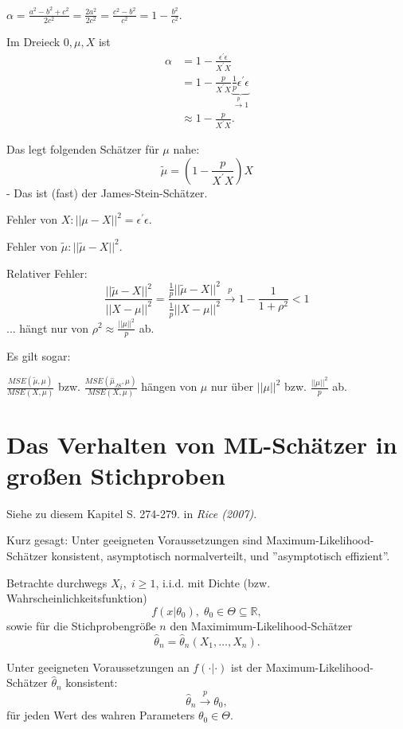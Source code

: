 \documentclass{tstextbook}
\newcommand{\R}{\mathbb R}
\begin{document}
	$ \alpha = \frac{a^2-b^2+c^2}{2c^2} = \frac{2a^2}{2c^2} = \frac{c^2-b^2}{c^2} = 1 - \frac{b^2}{c^2} $. 
	
	Im Dreieck $ 0,\mu,X $ ist 
	\[
	\begin{aligned}
		\alpha & = 1- \frac{\epsilon^\prime\epsilon}{X^\prime X} \\
		& = 1 - \frac{p}{X^\prime X}\underbrace{\frac{1}{p}\epsilon^\prime\epsilon}_{\xrightarrow{p} 1} \\
		& \approx 1- \frac{p}{X^\prime X}.
	\end{aligned}
	\]
	
	Das legt folgenden Schätzer für $ \mu $ nahe:
	\[
	\tilde{\mu} = \left(1-\frac{p}{X^\prime X}\right)X
	\]
	- Das ist (fast) der James-Stein-Schätzer. 
	
	Fehler von $ X\colon ||\mu-X||^2 = \epsilon^\prime \epsilon $. 
	
	Fehler von $ \tilde{\mu}  \colon ||\tilde{\mu} -X||^2 $. 
	
	Relativer Fehler: 
	\[
	\frac{||\tilde{\mu}-X||^2}{||X-\mu||^2} = \frac{\frac{1}{p}||\tilde{\mu}-X||^2}{\frac{1}{p}||X-\mu||^2} \xrightarrow{p} 1-\frac{1}{1+\rho^2} < 1
	\]
	... hängt nur von $ \rho^2  \approx \frac{||\mu||^2}{p} $ ab.
	
	Es gilt sogar:
	
	$ \frac{MSE(\tilde{\mu},\mu)}{MSE(X,\mu)} $ bzw. 	$ \frac{MSE(\hat{\mu}_{JS},\mu)}{MSE(X,\mu)} $ hängen von $ \mu $ nur über $ ||\mu||^2 $ bzw. $ \frac{||\mu||^2}{p} $ ab.
	
	
	\section{Das Verhalten von ML-Schätzer in großen Stichproben}
	
	\begin{book}
		Siehe zu diesem Kapitel S. 274-279. in	\textit{Rice (2007)}.
	\end{book}
	
	Kurz gesagt: Unter geeigneten Voraussetzungen sind Maximum-Likelihood-Schätzer konsistent, asymptotisch normalverteilt, und ''asymptotisch effizient''.
	
	Betrachte durchwegs $ X_i, \; i \ge 1 $, i.i.d. mit Dichte (bzw. Wahrscheinlichkeitsfunktion)
	\[
	f(x|\theta_0), \; \theta_0\in\Theta\subseteq\R,
	\] 
	sowie für die Stichprobengröße $ n $ den Maximimum-Likelihood-Schätzer 
	\[
	\hat{\theta}_n = \hat{\theta}_n\left(X_1,\ldots,X_n\right).
	\]
	
	\begin{satz}[Konsistenz]
		Unter geeigneten Voraussetzungen an $ f(\cdot|\cdot) $ ist der Maximum-Likelihood-Schätzer $ \hat{\theta}_n $ konsistent:
		\[
		\hat{\theta}_n \xrightarrow{p} \theta_0,
		\]
		für jeden Wert des wahren Parameters $ \theta_0\in\Theta $.
	\end{satz}
	
\end{document}
